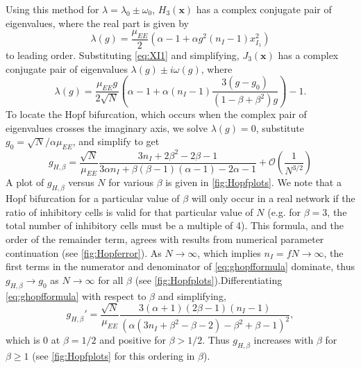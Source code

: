 \documentclass[11pt,reqno]{amsart}
\newcommand{\xvec}{\mathbf{x}}
\begin{document}
Using this method for $\lambda = \lambda_0 \pm \omega_0$, $H_3(\xvec)$ has a complex conjugate pair of eigenvalues, where the real part is given by
\begin{equation}
\lambda(g) = \frac{\mu_{EE}}{2}\left( \alpha - 1 + \alpha g^2 (n_I-1) x_{I_1}^2 \right)
\end{equation}
to leading order. Substituting \cref{eq:XI1} and simplifying, $J_3(\xvec)$ has a complex conjugate pair of eigenvalues $\lambda(g) \pm i \omega(g)$, where
\begin{equation*}
\lambda(g) = \frac{\mu_{EE} g}{2 \sqrt{N}}\left( \alpha - 1 + \alpha (n_I-1) \frac{ 3(g - g_0) }{ (1 - \beta + \beta^2 )g} \right) - 1.
\end{equation*}
To locate the Hopf bifurcation, which occurs when the complex pair of eigenvalues crosses the imaginary axis, we solve $\lambda(g) = 0$, substitute $g_0 = \sqrt{N}/\alpha \mu_{EE}$, and simplify to get
\begin{equation}\label{eq:ghopfformula}
    g_{H,\beta} = 
    \frac{\sqrt{N}}{\mu_{EE}} 
    \frac{ 3 n_I + 2 \beta^2 - 2 \beta - 1 }
    { 3 \alpha n_I + \beta(\beta-1)(\alpha-1) - 2 \alpha - 1}
    + \mathcal{O}\left( \frac{1}{N^{3/2}} \right)
\end{equation}
A plot of $g_{H,\beta}$ versus $N$ for various $\beta$ is given in \cref{fig:Hopfplots}. We note that a Hopf bifurcation for a particular value of $\beta$ will only occur in a real network if the ratio of inhibitory cells is valid for that particular value of $N$ (e.g. for $\beta = 3$, the total number of inhibitory cells must be a multiple of 4). This formula, and the order of the remainder term, agrees with results from numerical parameter continuation (see \cref{fig:Hopferror}). As $N \rightarrow \infty$, which implies $n_I = f N \rightarrow \infty$, the first terms in the numerator and denominator of \cref{eq:ghopfformula} dominate, thus $g_{H,\beta}  \rightarrow g_0$ as $N \rightarrow \infty$ for all $\beta$ (see \cref{fig:Hopfplots}).Differentiating \cref{eq:ghopfformula} with respect to $\beta$ and simplifying,
\begin{equation}\label{eq:gprime}
g_{H,\beta}' = \frac{ \sqrt{N} }{ \mu_{EE} }
    \frac{ 
    3(\alpha+1)(2\beta-1)(n_I-1)
    }
    { 
        \left( \alpha(3 n_I + \beta^2 - \beta - 2) - \beta^2 + \beta - 1 \right)^2
    },
\end{equation}
which is 0 at $\beta = 1/2$ and positive for $\beta > 1/2$. Thus $g_{H,\beta}$ increases with $\beta$ for $\beta \geq 1$ (see \cref{fig:Hopfplots} for this ordering in $\beta$). 
\end{document}
